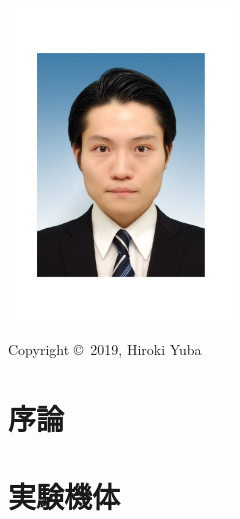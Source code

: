 \documentclass[12pt,epsf,here,fleqn]{jreport}
\begin{document}
\baselineskip=0.8cm%
\baselineskip=0.9cm%

\vspace*{13cm}
\begin{flushleft}
\hspace*{-9mm}
\includegraphics[height=8.3cm,width=6.0cm,clip]{z_figure_files/author.pdf}
\end{flushleft}
\vspace*{-5mm}
\hspace*{-9mm}
Copyright \copyright \, 2019, Hiroki Yuba


\thispagestyle{empty}%
\baselineskip=0.9cm%
\tableofcontents%
\newpage%
\baselineskip=0.7cm%
\setcounter{page}{1}%

\chapter{序論}
  
\chapter{実験機体}
  \label{aircraft}
  
\end{document}

